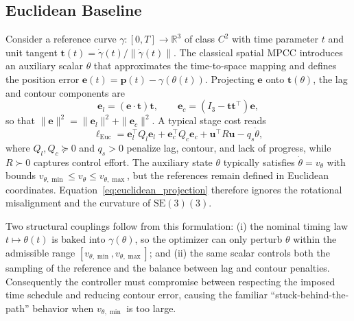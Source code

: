 \documentclass[letterpaper, 10pt, conference]{IEEEtran}
\newcommand{\SE}{\mathrm{SE}(3)}
\newcommand{\RR}{\mathbb{R}}
\begin{document}
\subsection{Euclidean Baseline}
Consider a reference curve $\gamma : [0,T] \to \RR^3$ of class $C^2$ with time parameter $t$ and unit tangent $\mathbf{t}(t) = \dot{\gamma}(t)/\|\dot{\gamma}(t)\|$. The classical spatial MPCC introduces an auxiliary scalar $\theta$ that approximates the time-to-space mapping and defines the position error $\mathbf{e}(t) = \mathbf{p}(t) - \gamma(\theta(t))$. Projecting $\mathbf{e}$ onto $\mathbf{t}(\theta)$, the lag and contour components are
\begin{equation}
    \mathbf{e}_l = (\mathbf{e} \cdot \mathbf{t}) \mathbf{t}, \qquad \mathbf{e}_c = (I_3 - \mathbf{t}\mathbf{t}^\top)\mathbf{e},
    \label{eq:euclidean_projection}
\end{equation}
so that $\|\mathbf{e}\|^2 = \|\mathbf{e}_l\|^2 + \|\mathbf{e}_c\|^2$. A typical stage cost reads
\begin{equation}
    \ell_{\text{Euc}} = \mathbf{e}_l^\top Q_l \mathbf{e}_l + \mathbf{e}_c^\top Q_c \mathbf{e}_c + \bm{u}^\top R \bm{u} - q_s \dot{\theta},
\end{equation}
where $Q_l,Q_c \succeq 0$ and $q_s > 0$ penalize lag, contour, and lack of progress, while $R \succ 0$ captures control effort. The auxiliary state $\theta$ typically satisfies $\dot{\theta} = v_{\theta}$ with bounds $v_{\theta,\min} \leq v_{\theta} \leq v_{\theta,\max}$, but the references remain defined in Euclidean coordinates. Equation~\eqref{eq:euclidean_projection} therefore ignores the rotational misalignment and the curvature of $\SE(3)$.

Two structural couplings follow from this formulation: (i) the nominal timing law $t \mapsto \theta(t)$ is baked into $\gamma(\theta)$, so the optimizer can only perturb $\theta$ within the admissible range $[v_{\theta,\min}, v_{\theta,\max}]$; and (ii) the same scalar controls both the sampling of the reference and the balance between lag and contour penalties. Consequently the controller must compromise between respecting the imposed time schedule and reducing contour error, causing the familiar ``stuck-behind-the-path'' behavior when $v_{\theta,\min}$ is too large.
\end{document}
